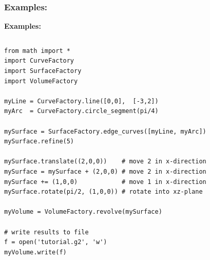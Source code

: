 \documentclass{beamer}
\theoremstyle{plain}
\theoremstyle{definition}
\begin{document}

\begin{frame}[fragile]
\frametitle{Examples:}
\textbf{Examples:}
\begin{columns}
    \begin{column}{.50\linewidth}
        \begin{listing}[H]
            \tiny
            \begin{verbatim}
from math import *
import CurveFactory                                                            
import SurfaceFactory                                                            
import VolumeFactory                                                            
                                                                               
myLine = CurveFactory.line([0,0],  [-3,2])                                   
myArc  = CurveFactory.circle_segment(pi/4)                                     

mySurface = SurfaceFactory.edge_curves([myLine, myArc])
mySurface.refine(5)

mySurface.translate((2,0,0))    # move 2 in x-direction
mySurface = mySurface + (2,0,0) # move 2 in x-direction
mySurface += (1,0,0)            # move 1 in x-direction
mySurface.rotate(pi/2, (1,0,0)) # rotate into xz-plane

myVolume = VolumeFactory.revolve(mySurface)
                                                                               
# write results to file                                                        
f = open('tutorial.g2', 'w')                                                   
myVolume.write(f)


\end{verbatim}
\end{listing}
\end{column}
\end{columns}
\end{frame}
\end{document}
